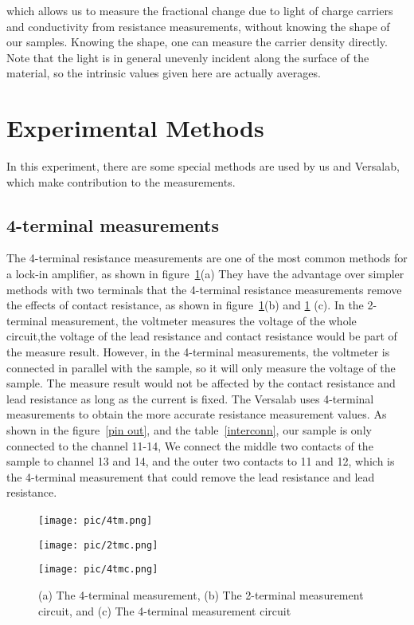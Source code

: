 \documentclass{article}
\begin{document}
which allows us to measure the fractional change due to light of charge carriers and conductivity from resistance measurements, without knowing the shape of our samples. Knowing the shape, one can measure the carrier density directly. Note that the light is in general unevenly incident along the surface of the material, so the intrinsic values given here are actually averages.


\section{Experimental Methods}
In this experiment, there are some special methods are used by us and Versalab, which make contribution to the measurements.
\subsection{4-terminal measurements}
The 4-terminal resistance measurements are one of the most common methods for a lock-in amplifier, as shown in figure~\ref{ter}(a)
They have the advantage over simpler methods with two terminals that the 4-terminal resistance measurements remove the effects of contact resistance, as shown in figure~\ref{ter}(b) and \ref{ter} (c)\parencite{Neves24}. In the 2-terminal measurement, the voltmeter measures the voltage of the whole circuit,the voltage of the lead resistance and contact resistance would be part of the measure result. However, in the 4-terminal measurements, the voltmeter is connected in parallel with the sample, so it will only measure the voltage of the sample. The measure result would not be affected by the contact resistance and lead resistance as long as the current is fixed. The Versalab uses 4-terminal measurements to obtain the more accurate resistance measurement values. As shown in the figure~\ref{pin out}, and the table~\ref{interconn}, our sample is only connected to the channel 11-14, We connect the middle two contacts of the sample to channel 13 and 14, and the outer two contacts to 11 and 12, which is the 4-terminal measurement that could remove the lead resistance and lead resistance.
\begin{figure}[H]
    \centering
    \begin{minipage}[t]{0.3\textwidth}
        \centering
        \texttt{[image: pic/4tm.png]}
       \
    \end{minipage}
    \hfill
    \begin{minipage}[t]{0.3\textwidth}
        \centering
        \texttt{[image: pic/2tmc.png]}
    \end{minipage}
    \hfill
    \begin{minipage}[t]{0.3\textwidth}
        \centering
        \texttt{[image: pic/4tmc.png]}
    \end{minipage}
    \caption{(a) The 4-terminal measurement, (b) The 2-terminal measurement circuit, and (c) The 4-terminal measurement circuit  }
    \label{ter}
\end{figure}
\end{document}
